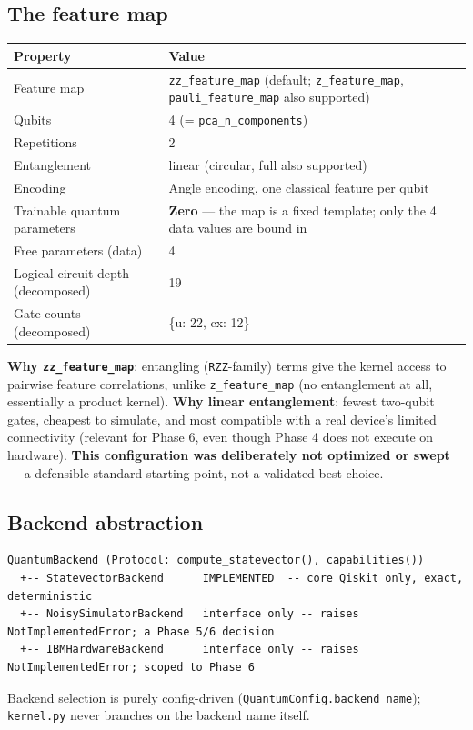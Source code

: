 \documentclass[11pt,a4paper]{article}
\newcommand{\code}[1]{\texttt{\small #1}}
\begin{document}
\subsection{The feature map}
\begin{tabularx}{\textwidth}{@{}p{4.4cm}Y@{}}
\toprule
\textbf{Property} & \textbf{Value} \\
\midrule
Feature map & \code{zz\_feature\_map} (default; \code{z\_feature\_map}, \code{pauli\_feature\_map} also supported) \\
Qubits & 4 (= \code{pca\_n\_components}) \\
Repetitions & 2 \\
Entanglement & linear (circular, full also supported) \\
Encoding & Angle encoding, one classical feature per qubit \\
Trainable quantum parameters & \textbf{Zero} --- the map is a fixed template; only the 4 data values are bound in \\
Free parameters (data) & 4 \\
Logical circuit depth (decomposed) & 19 \\
Gate counts (decomposed) & \{u: 22, cx: 12\} \\
\bottomrule
\end{tabularx}
\textbf{Why \code{zz\_feature\_map}}: entangling (\code{RZZ}-family) terms give the kernel access to pairwise feature correlations, unlike \code{z\_feature\_map} (no entanglement at all, essentially a product kernel). \textbf{Why linear entanglement}: fewest two-qubit gates, cheapest to simulate, and most compatible with a real device's limited connectivity (relevant for Phase 6, even though Phase 4 does not execute on hardware). \textbf{This configuration was deliberately not optimized or swept} --- a defensible standard starting point, not a validated best choice.

\subsection{Backend abstraction}
\begin{center}
\begin{lstlisting}
QuantumBackend (Protocol: compute_statevector(), capabilities())
  +-- StatevectorBackend      IMPLEMENTED  -- core Qiskit only, exact, deterministic
  +-- NoisySimulatorBackend   interface only -- raises NotImplementedError; a Phase 5/6 decision
  +-- IBMHardwareBackend      interface only -- raises NotImplementedError; scoped to Phase 6
\end{lstlisting}
\end{center}
Backend selection is purely config-driven (\code{QuantumConfig.backend\_name}); \code{kernel.py} never branches on the backend name itself.
\end{document}
